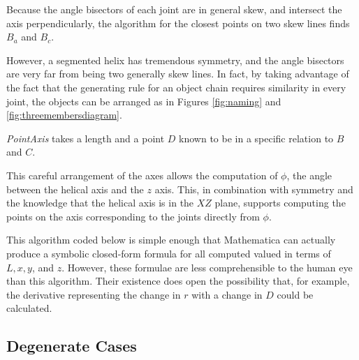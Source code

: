 \documentclass{svproc}
\begin{document}
Because the angle bisectors of each joint are in general skew, and intersect the
axis perpendicularly, the algorithm
for the closest points on two skew lines finds $B_a$ and $B_c$.

However, a segmented helix has
tremendous symmetry, and the angle bisectors are very far from being two
generally skew lines. In fact, by taking advantage of the fact that the
generating rule for an object chain requires similarity in every joint,
the objects can be arranged as in Figures \ref{fig:naming} and \ref{fig:threemembersdiagram}.

{\em PointAxis} takes a length and a point $D$ known to be in
a specific relation to $B$ and $C$.

This careful arrangement of the axes
allows the computation of $\phi$, the angle between the helical axis
and the $z$ axis. This, in combination with symmetry and the knowledge
that the helical axis is in the $XZ$ plane, supports computing the
points on the axis corresponding to the joints directly from $\phi$.

This algorithm coded below is simple enough that Mathematica\cite{Mathematica} can
actually produce a symbolic closed-form formula for all computed valued
in terms of $L, x, y$, and $z$.
However, these formulae are less comprehensible to the
human eye than this algorithm.
Their existence does open
the possibility that, for example, the derivative representing
the change in $r$ with a change in $D$ could be calculated.

\subsection{Degenerate Cases}
\end{document}
